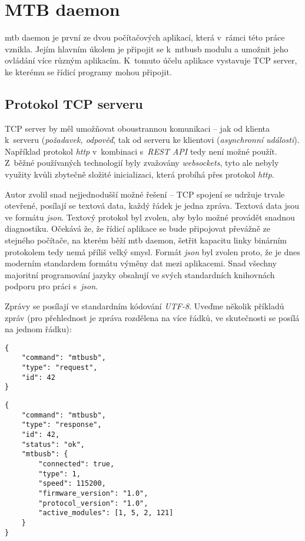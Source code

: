 \section{MTB daemon}

\gls{mtb} daemon je první ze dvou počítačových aplikací, která v~rámci této
práce vznikla. Jejím hlavním úkolem je připojit se k~\gls{mtbusb} modulu
a umožnit jeho ovládání více různým aplikacím. K~tomuto účelu aplikace vystavuje
TCP server, ke kterému se řídicí programy mohou připojit.

\subsection{Protokol TCP serveru} \label{sec:daemon:proto}

TCP server by měl umožňovat oboustrannou komunikaci – jak od klienta k~serveru
(\textit{požadavek, odpověď}, tak od serveru ke klientovi (\textit{asynchronní
události}). Například protokol \textit{http} v~kombinaci s~\textit{REST API}
tedy není možné použít. Z~běžné používaných technologií byly zvažovány
\textit{websockets}, tyto ale nebyly využity kvůli zbytečně složité inicializaci,
která probíhá přes protokol \textit{http}.

Autor zvolil snad nejjednodušší možné řešení – TCP spojení se udržuje trvale
otevřené, posílají se textová data, každý řádek je jedna zpráva. Textová data
jsou ve formátu \textit{json}. Textový protokol byl zvolen, aby bylo možné
provádět snadnou diagnostiku. Očekává že, že řídicí aplikace se bude připojovat
převážně ze stejného počítače, na kterém běží \gls{mtb} daemon, šetřit kapacitu
linky binárním protokolem tedy nemá příliš velký smysl. Formát \textit{json}
byl zvolen proto, že je dnes moderním standardem formátu výměny dat mezi
aplikacemi. Snad všechny majoritní programování jazyky obsahují ve svých
standardních knihovnách podporu pro práci s~\textit{json}.

Zprávy se posílají ve standardním kódování \textit{UTF-8}. Uveďme několik
příkladů zpráv (pro přehlednost je zpráva rozdělena na více řádků, ve skutečnosti
se posílá na jednom řádku):

\begin{verbatim}
{
    "command": "mtbusb",
    "type": "request",
    "id": 42
}
\end{verbatim}

\begin{verbatim}
{
    "command": "mtbusb",
    "type": "response",
    "id": 42,
    "status": "ok",
    "mtbusb": {
        "connected": true,
        "type": 1,
        "speed": 115200,
        "firmware_version": "1.0",
        "protocol_version": "1.0",
        "active_modules": [1, 5, 2, 121]
    }
}
\end{verbatim}


